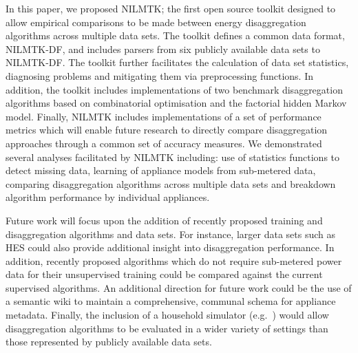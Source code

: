 \documentclass{sig-alternate}
\begin{document}
\noindent
In this paper, we proposed NILMTK; the first open source toolkit designed to allow empirical comparisons to be made between energy disaggregation algorithms across multiple data sets. The toolkit defines a common data format, NILMTK-DF, and includes parsers from six publicly available data sets to NILMTK-DF. The toolkit further facilitates the calculation of data set statistics, diagnosing problems and mitigating them via preprocessing functions. In addition, the toolkit includes implementations of two benchmark disaggregation algorithms based on combinatorial optimisation and the factorial hidden Markov model. Finally, NILMTK includes implementations of a set of performance metrics which will enable future research to directly compare disaggregation approaches through a common set of accuracy measures. We demonstrated several analyses facilitated by NILMTK including: use of statistics functions to detect missing data, learning of appliance models from sub-metered data, comparing disaggregation algorithms across multiple data sets and breakdown algorithm performance by individual appliances.

Future work will focus upon the addition of recently proposed training and disaggregation algorithms and data sets. For instance, larger data sets such as HES could also provide additional insight into disaggregation performance.
In addition, recently proposed algorithms which do not require sub-metered power data for their unsupervised training could be compared against the current supervised algorithms.
An additional direction for future work could be the use of a semantic wiki to maintain a comprehensive, communal schema for appliance metadata.
Finally, the inclusion of a household simulator (e.g.\ \cite{liang_2010}) would allow disaggregation algorithms to be evaluated in a wider variety of settings than those represented by publicly available data sets.
\end{document}
